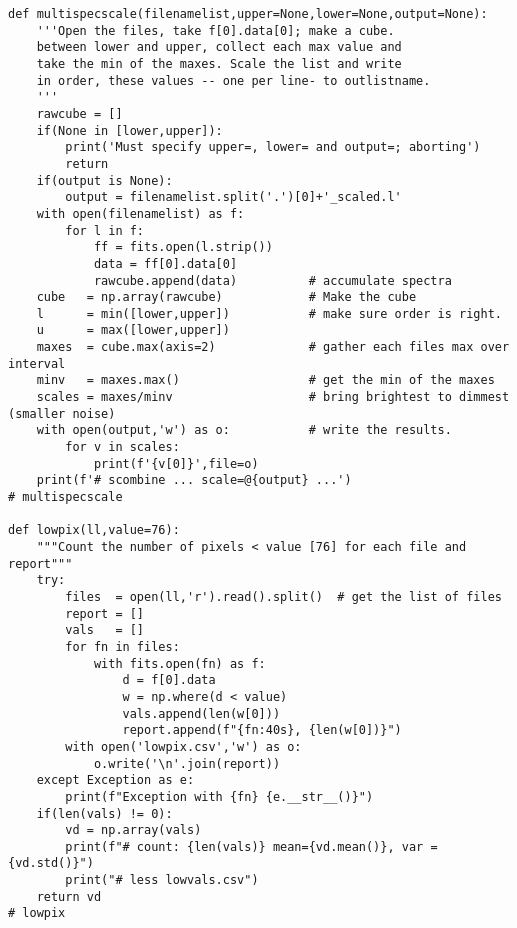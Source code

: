 {\begin{verbatim}
def multispecscale(filenamelist,upper=None,lower=None,output=None):
    '''Open the files, take f[0].data[0]; make a cube.
    between lower and upper, collect each max value and
    take the min of the maxes. Scale the list and write
    in order, these values -- one per line- to outlistname.
    '''
    rawcube = []
    if(None in [lower,upper]):
        print('Must specify upper=, lower= and output=; aborting')
        return
    if(output is None):
        output = filenamelist.split('.')[0]+'_scaled.l'
    with open(filenamelist) as f:
        for l in f:
            ff = fits.open(l.strip())
            data = ff[0].data[0]
            rawcube.append(data)          # accumulate spectra
    cube   = np.array(rawcube)            # Make the cube
    l      = min([lower,upper])           # make sure order is right.
    u      = max([lower,upper])
    maxes  = cube.max(axis=2)             # gather each files max over interval
    minv   = maxes.max()                  # get the min of the maxes
    scales = maxes/minv                   # bring brightest to dimmest (smaller noise)
    with open(output,'w') as o:           # write the results.
        for v in scales:
            print(f'{v[0]}',file=o)
    print(f'# scombine ... scale=@{output} ...')
# multispecscale

def lowpix(ll,value=76):
    """Count the number of pixels < value [76] for each file and report"""
    try:
        files  = open(ll,'r').read().split()  # get the list of files
        report = []
        vals   = []
        for fn in files:
            with fits.open(fn) as f:
                d = f[0].data
                w = np.where(d < value)
                vals.append(len(w[0]))
                report.append(f"{fn:40s}, {len(w[0])}")
        with open('lowpix.csv','w') as o:
            o.write('\n'.join(report))
    except Exception as e:
        print(f"Exception with {fn} {e.__str__()}")
    if(len(vals) != 0):
        vd = np.array(vals)
        print(f"# count: {len(vals)} mean={vd.mean()}, var = {vd.std()}")
        print("# less lowvals.csv")
    return vd
# lowpix


\end{verbatim}}
